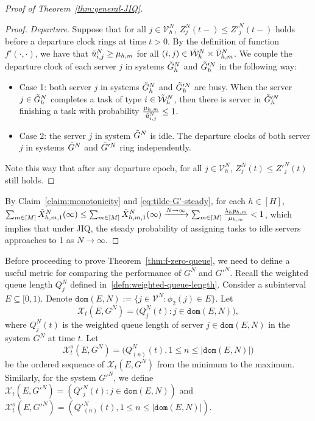 \documentclass[11pt, reqno]{article}
\numberwithin{equation}{section}
\numberwithin{theorem}{section}
\let\plainqed\qedsymbol
\newcommand{\claimqed}{$\lrcorner$}
\newenvironment{claimproof}{\begin{proof}\renewcommand{\qedsymbol}{\claimqed}}{\end{proof}\renewcommand{\qedsymbol}{\plainqed}}
\newcommand{\dom}{\texttt{dom}}
\begin{document}
\begin{proof}[Proof of Theorem~\ref{thm:general-JIQ}]
\begin{claimproof}
\noindent
\textit{Departure}. Suppose that for all $j\in\mathcal{V}^N_h$,  $Z^N_j(t-)\leq Z'^N_j(t-)$ holds before a departure clock rings at time $t>0$. By the definition of function $f'(\cdot,\cdot)$, we have that $\Tilde{u}^N_{i,j}\geq \mu_{h,m}$ for all $(i,j)\in \Tilde{\mathcal{W}}^N_h\times\Tilde{\mathcal{V}}^N_{h,m}$. We couple the departure clock of each server $j$ in systems $\Tilde{G}^N_h$ and $\Tilde{G}'^N_h$ in the following way:
\begin{itemize}
    \item Case 1: both server $j$ in systems $\Tilde{G}^N_h$ and $\Tilde{G}'^N_h$ are busy. When the server $j\in \Tilde{G}^N_h$ completes a task of type $i\in\Tilde{\mathcal{W}}^N_h$, then there is server in $\Tilde{G}'^N_h$ finishing a task with probability $\frac{\mu_{h,m}}{\Tilde{u}^N_{i,j}}\leq 1$.
    \item Case 2: the server $j$ in system $\Tilde{G}^N$ is idle. The departure clocks of both server $j$ in systems $\Tilde{G}^N$ and $\Tilde{G}'^N$ ring independently.
\end{itemize}
Note this way that after any departure epoch, for all $j\in\mathcal{V}^N_h$,  $Z^N_j(t)\leq Z'^N_j(t)$ still holds.
\end{claimproof}
\noindent
By Claim~\ref{claim:monotonicity} and \eqref{eq:tilde-G'-steady}, for each $h\in[H]$, $\sum_{m\in[M]}\Tilde{X}^N_{h,m,1}(\infty)\leq\sum_{m\in[M]}\Tilde{X}^N_{h,m,1}(\infty)\xrightarrow{N\rightarrow\infty}\sum_{m\in[M]}\frac{\lambda_hp_{h,m}}{\mu_{h,m}}<1$, which implies that under JIQ, the steady probability of assigning tasks to idle servers approaches to 1 as $N\rightarrow\infty$.  
\end{proof}


Before proceeding to prove Theorem~\ref{thm:f-zero-queue}, we need to define a useful metric for comparing the performance of $G^N$ and $G'^N$. 
Recall the weighted queue length $Q^N_j$ defined in~\eqref{defn:weighted-queue-length}.
Consider a subinterval $E\subseteq[0,1)$. 
Denote $\dom(E,N):=\{j\in\mathcal{V}^N:\phi_2(j)\in E\}$. 
Let $$\mathcal{X}_t(E,G^N)=\big(Q^N_j(t):j\in\dom(E,N)\big),$$ where $Q^N_j(t)$ is the weighted queue length of server $j\in\dom(E,N)$ in the system $G^N$ at time $t$. 
Let $$\mathcal{X}^o_t(E,G^N)=\big(Q^N_{(n)}(t),1\leq n\leq |\dom(E,N)|\big)$$ be the ordered sequence of $\mathcal{X}_t(E,G^N)$ from the minimum to the maximum. 
Similarly, for the system $G'^N$, we define $\mathcal{X}_t(E,G'^N)=(Q'^N_j(t):j\in\dom(E,N))$ and $\mathcal{X}^o_t(E,G'^N)=(Q'^N_{(n)}(t),1\leq n\leq |\dom(E,N)|)$. 
\end{document}
